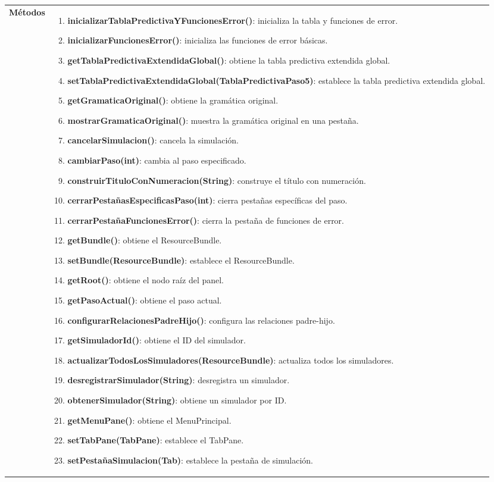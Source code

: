 \begin{longtable}[H]{|>{\columncolor[rgb]{0.63,0.79,0.95}}m{6cm} | m{8.5cm} |}
 \textbf{Métodos} & \begin{enumerate}
 		\item \textbf{inicializarTablaPredictivaYFuncionesError()}: inicializa la tabla y funciones de error.
 		\item \textbf{inicializarFuncionesError()}: inicializa las funciones de error básicas.
 		\item \textbf{getTablaPredictivaExtendidaGlobal()}: obtiene la tabla predictiva extendida global.
 		\item \textbf{setTablaPredictivaExtendidaGlobal(TablaPredictivaPaso5)}: establece la tabla predictiva extendida global.
 		\item \textbf{getGramaticaOriginal()}: obtiene la gramática original.
 		\item \textbf{mostrarGramaticaOriginal()}: muestra la gramática original en una pestaña.
 		\item \textbf{cancelarSimulacion()}: cancela la simulación.
 		\item \textbf{cambiarPaso(int)}: cambia al paso especificado.
 		\item \textbf{construirTituloConNumeracion(String)}: construye el título con numeración.
 		\item \textbf{cerrarPestañasEspecificasPaso(int)}: cierra pestañas específicas del paso.
 		\item \textbf{cerrarPestañaFuncionesError()}: cierra la pestaña de funciones de error.
 		\item \textbf{getBundle()}: obtiene el ResourceBundle.
 		\item \textbf{setBundle(ResourceBundle)}: establece el ResourceBundle.
 		\item \textbf{getRoot()}: obtiene el nodo raíz del panel.
 		\item \textbf{getPasoActual()}: obtiene el paso actual.
 		\item \textbf{configurarRelacionesPadreHijo()}: configura las relaciones padre-hijo.
 		\item \textbf{getSimuladorId()}: obtiene el ID del simulador.
 		\item \textbf{actualizarTodosLosSimuladores(ResourceBundle)}: actualiza todos los simuladores.
 		\item \textbf{desregistrarSimulador(String)}: desregistra un simulador.
 		\item \textbf{obtenerSimulador(String)}: obtiene un simulador por ID.
 		\item \textbf{getMenuPane()}: obtiene el MenuPrincipal.
 		\item \textbf{setTabPane(TabPane)}: establece el TabPane.
 		\item \textbf{setPestañaSimulacion(Tab)}: establece la pestaña de simulación.
\end{enumerate}
                                 
 \label{tabla132}

\end{longtable}

